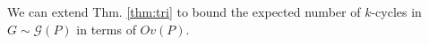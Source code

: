 \documentclass{article}
\newtheorem{theorem}{Theorem}
\newcommand{\norm}[1]{\|#1\|}
\newcommand{\E}{\mathbb{E}}
\DeclareMathOperator{\tr}{tr}
\begin{document}
We can extend Thm. \ref{thm:tri} to bound the expected number of $k$-cycles in $G \sim \mathcal{G}(P)$ in terms of $Ov(P)$. %
%
\end{document}
